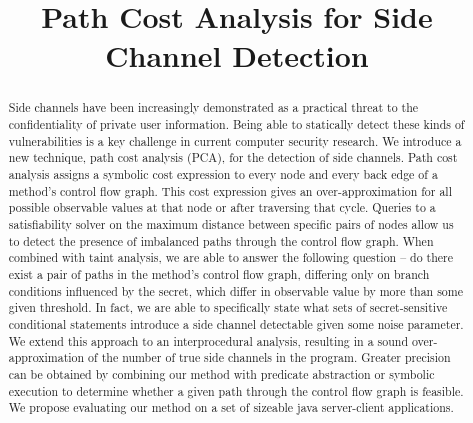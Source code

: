 \documentclass[sigconf]{acmart}
\begin{document}
\newcommand\todo[1]{\textcolor{red}{#1}}

\title{Path Cost Analysis for Side Channel Detection}


\begin{abstract}
Side channels have been increasingly demonstrated as a practical threat to the confidentiality of private user information. Being able to statically detect these kinds of vulnerabilities is a key challenge in current computer security research. We introduce a new technique, path cost analysis (PCA), for the detection of side channels. Path cost analysis assigns a symbolic cost expression to every node and every back edge of a method's control flow graph. This cost expression gives an over-approximation for all possible observable values at that node or after traversing that cycle. Queries to a satisfiability solver on the maximum distance between specific pairs of nodes allow us to detect the presence of imbalanced paths through the control flow graph. When combined with taint analysis, we are able to answer the following question -- do there exist a pair of paths in the method's control flow graph, differing only on branch conditions influenced by the secret, which differ in observable value by more than some given threshold. In fact, we are able to specifically state what sets of secret-sensitive conditional statements introduce a side channel detectable given some noise parameter. We extend this approach to an interprocedural analysis, resulting in a sound over-approximation of the number of true side channels in the program. Greater precision can be obtained by combining our method with predicate abstraction or symbolic execution to determine whether a given path through the control flow graph is feasible. We propose evaluating our method on a set of sizeable java server-client applications. 
\end{abstract}



\maketitle







\end{document}
